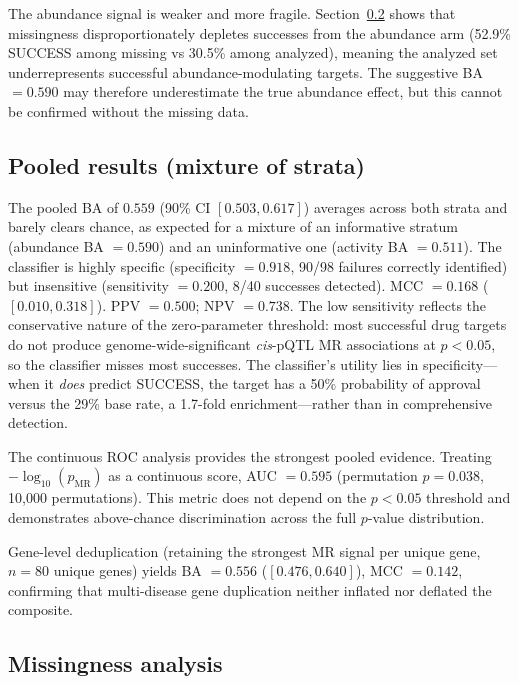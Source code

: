 \documentclass[11pt]{article}
\begin{document}
The abundance signal is weaker and more fragile. Section~\ref{sec:missing} shows that missingness disproportionately depletes successes from the abundance arm (52.9\% SUCCESS among missing vs 30.5\% among analyzed), meaning the analyzed set underrepresents successful abundance-modulating targets. The suggestive BA $= 0.590$ may therefore underestimate the true abundance effect, but this cannot be confirmed without the missing data.

\subsection{Pooled results (mixture of strata)}
\label{sec:primary}

The pooled BA of $0.559$ (90\% CI $[0.503, 0.617]$) averages across both strata and barely clears chance, as expected for a mixture of an informative stratum (abundance BA $= 0.590$) and an uninformative one (activity BA $= 0.511$). The classifier is highly specific (specificity $= 0.918$, 90/98 failures correctly identified) but insensitive (sensitivity $= 0.200$, 8/40 successes detected). MCC $= 0.168$ ($[0.010, 0.318]$). PPV $= 0.500$; NPV $= 0.738$. The low sensitivity reflects the conservative nature of the zero-parameter threshold: most successful drug targets do not produce genome-wide-significant \emph{cis}-pQTL MR associations at $p < 0.05$, so the classifier misses most successes. The classifier's utility lies in specificity---when it \emph{does} predict SUCCESS, the target has a 50\% probability of approval versus the 29\% base rate, a 1.7-fold enrichment---rather than in comprehensive detection.

The continuous ROC analysis provides the strongest pooled evidence. Treating $-\log_{10}(p_{\text{MR}})$ as a continuous score, AUC $= 0.595$ (permutation $p = 0.038$, 10{,}000 permutations). This metric does not depend on the $p < 0.05$ threshold and demonstrates above-chance discrimination across the full $p$-value distribution.

Gene-level deduplication (retaining the strongest MR signal per unique gene, $n = 80$ unique genes) yields BA $= 0.556$ ($[0.476, 0.640]$), MCC $= 0.142$, confirming that multi-disease gene duplication neither inflated nor deflated the composite.

\subsection{Missingness analysis}
\label{sec:missing}
\end{document}

